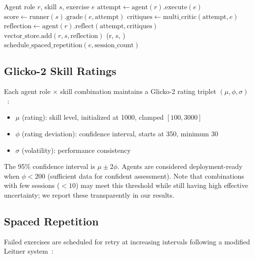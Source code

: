 \documentclass[11pt,a4paper]{article}
\begin{document}
\begin{algorithm}[h]
\caption{Agent Gym Training Session}
\label{alg:gym}
\begin{algorithmic}[1]
\REQUIRE Agent role $r$, skill $s$, exercise $e$
\STATE $\text{attempt} \leftarrow \text{agent}(r).\text{execute}(e)$ 
\STATE $\text{score} \leftarrow \text{runner}(s).\text{grade}(e, \text{attempt})$ 
\STATE $\text{critiques} \leftarrow \text{multi\_critic}(\text{attempt}, e)$ 
\STATE $\text{reflection} \leftarrow \text{agent}(r).\text{reflect}(\text{attempt}, \text{critiques})$ 
\STATE $\text{vector\_store}.\text{add}(r, s, \text{reflection})$ 
\STATE {}(r, s, )
    \STATE $\text{schedule\_spaced\_repetition}(e, \text{session\_count})$
\ENDIF
\end{algorithmic}
\end{algorithm}

\subsection{Glicko-2 Skill Ratings}

Each agent role $\times$ skill combination maintains a Glicko-2 rating triplet $(\mu, \phi, \sigma)$~\citep{glickman2001glicko2}:

\begin{itemize}[noitemsep]
    \item $\mu$ (rating): skill level, initialized at 1000, clamped $[100, 3000]$
    \item $\phi$ (rating deviation): confidence interval, starts at 350, minimum 30
    \item $\sigma$ (volatility): performance consistency
\end{itemize}

The 95\% confidence interval is $\mu \pm 2\phi$. Agents are considered deployment-ready when $\phi < 200$ (sufficient data for confident assessment). Note that combinations with few sessions ($<10$) may meet this threshold while still having high effective uncertainty; we report these transparently in our results.

\subsection{Spaced Repetition}

Failed exercises are scheduled for retry at increasing intervals following a modified Leitner system~\citep{leitner1972}:
\end{document}
